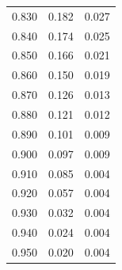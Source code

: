 \begin{tabular}{rrr}
0.830 & 0.182 & 0.027 \\
0.840 & 0.174 & 0.025 \\
0.850 & 0.166 & 0.021 \\
0.860 & 0.150 & 0.019 \\
0.870 & 0.126 & 0.013 \\
0.880 & 0.121 & 0.012 \\
0.890 & 0.101 & 0.009 \\
0.900 & 0.097 & 0.009 \\
0.910 & 0.085 & 0.004 \\
0.920 & 0.057 & 0.004 \\
0.930 & 0.032 & 0.004 \\
0.940 & 0.024 & 0.004 \\
0.950 & 0.020 & 0.004 \\
\bottomrule
\end{tabular}
